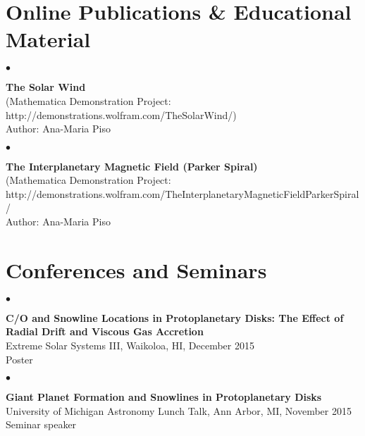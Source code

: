 \documentclass[margin,line]{res}
\newenvironment{list2}{
  \begin{list}{$\bullet$}{%
      \setlength{\itemsep}{0in}
      \setlength{\parsep}{0in} \setlength{\parskip}{0in}
      \setlength{\topsep}{0in} \setlength{\partopsep}{0in} 
      \setlength{\leftmargin}{0.2in}}}{\end{list}}
\begin{document}
\begin{resume}

\section{\sc Online Publications \& Educational Material}

\begin{list2}
\item[] {\bf The Solar Wind} \\
(Mathematica Demonstration Project: http://demonstrations.wolfram.com/TheSolarWind/) \\
Author: Ana-Maria Piso \\
\end{list2}

\vspace*{-.13in}
\begin{list2}
\item[] {\bf The Interplanetary Magnetic Field (Parker Spiral)} \\
(Mathematica Demonstration Project: \\
http://demonstrations.wolfram.com/TheInterplanetaryMagneticFieldParkerSpiral/ \\
Author: Ana-Maria Piso \\
\end{list2}


\section{\sc Conferences and Seminars}

\begin{list2}
\item[] {\bf C/O and Snowline Locations in Protoplanetary Disks: The Effect of Radial Drift and Viscous Gas Accretion} \\
Extreme Solar Systems III, Waikoloa, HI, December 2015 \\
Poster \\
\end{list2}

\begin{list2}
\item[] {\bf Giant Planet Formation and Snowlines in Protoplanetary Disks} \\
University of Michigan Astronomy Lunch Talk, Ann Arbor, MI, November 2015 \\
Seminar speaker \\
\end{list2}


\end{resume}
\end{document}
